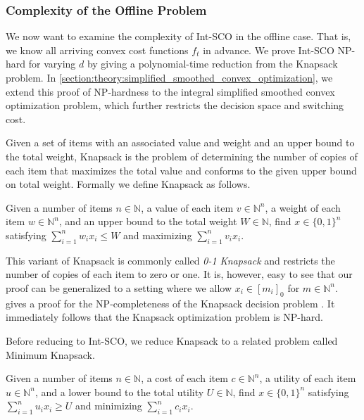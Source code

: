 \subsubsection{Complexity of the Offline Problem}

We now want to examine the complexity of Int-SCO in the offline case. That is, we know all arriving convex cost functions $f_t$ in advance. We prove Int-SCO NP-hard for varying $d$ by giving a polynomial-time reduction from the Knapsack problem. In \autoref{section:theory:simplified_smoothed_convex_optimization}, we extend this proof of NP-hardness to the integral simplified smoothed convex optimization problem, which further restricts the decision space and switching cost.

Given a set of items with an associated value and weight and an upper bound to the total weight, Knapsack is the problem of determining the number of copies of each item that maximizes the total value and conforms to the given upper bound on total weight. Formally we define Knapsack as follows.

\begin{problem}[Knapsack (KP)]
Given a number of items $n \in \mathbb{N}$, a value of each item $v \in \mathbb{N}^n$, a weight of each item $w \in \mathbb{N}^n$, and an upper bound to the total weight $W \in \mathbb{N}$, find $x \in \{0,1\}^n$ satisfying $\sum_{i = 1}^n w_i x_i \leq W$ and maximizing $\sum_{i=1}^n v_i x_i$.
\end{problem}

This variant of Knapsack is commonly called \emph{0-1 Knapsack} and restricts the number of copies of each item to zero or one. It is, however, easy to see that our proof can be generalized to a setting where we allow $x_i \in [m_i]_0$ for $m \in \mathbb{N}^n$. \citeauthor*{Williamson2014} gives a proof for the NP-completeness of the Knapsack decision problem \cite{Williamson2014}. It immediately follows that the Knapsack optimization problem is NP-hard.

Before reducing to Int-SCO, we reduce Knapsack to a related problem called Minimum Knapsack.

\begin{problem}
Given a number of items $n \in \mathbb{N}$, a cost of each item $c \in \mathbb{N}^n$, a utility of each item $u \in \mathbb{N}^n$, and a lower bound to the total utility $U \in \mathbb{N}$, find $x \in \{0,1\}^n$ satisfying $\sum_{i = 1}^n u_i x_i \geq U$ and minimizing $\sum_{i=1}^n c_i x_i$.
\end{problem}

